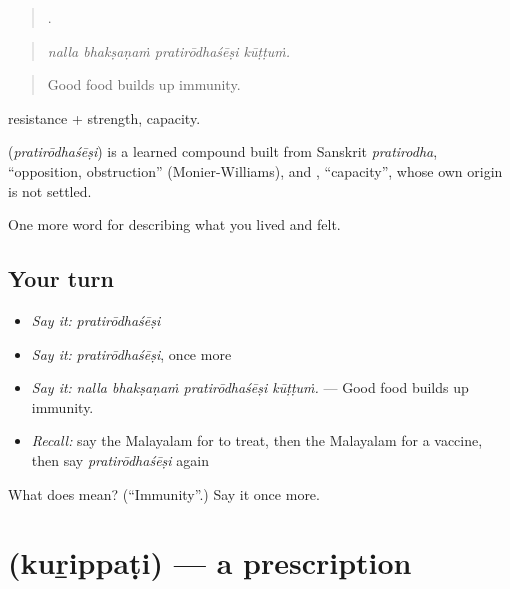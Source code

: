 \begin{quote}
   .
\end{quote}

\begin{quote}
\emph{nalla bhakṣaṇaṁ pratirōdhaśēṣi kūṭṭuṁ.}
\end{quote}

\begin{quote}
Good food builds up immunity.
\end{quote}

 resistance +  strength, capacity.

\begin{cousinweb}
\textbf{} (\emph{pratirōdhaśēṣi}) is a learned compound built from Sanskrit \emph{pratirodha}, \textquotedblleft{}opposition, obstruction\textquotedblright{} (Monier-Williams), and , \textquotedblleft{}capacity\textquotedblright{}, whose own origin is not settled.
\end{cousinweb}

\begin{grammarlens}[title={What you've built}]
One more word for describing what you lived and felt.
\end{grammarlens}

\subsection*{Your turn}
\begin{itemize}
\raggedright
  \item \emph{Say it:} \emph{pratirōdhaśēṣi}
  \item \emph{Say it:} \emph{pratirōdhaśēṣi}, once more
  \item \emph{Say it:} \emph{nalla bhakṣaṇaṁ pratirōdhaśēṣi kūṭṭuṁ.} — Good food builds up immunity.
  \item \emph{Recall:} say the Malayalam for to treat, then the Malayalam for a vaccine, then say \emph{pratirōdhaśēṣi} again
\end{itemize}

\begin{tcolorbox}[breakable,colback=teal!4,colframe=teal!35!black,title={Before you move on}]
What does  mean? (\textquotedblleft{}Immunity\textquotedblright{}.) Say it once more.
\end{tcolorbox}
\section[\texorpdfstring{\ml{കുറിപ്പടി} (kuṟippaṭi)}{കുറിപ്പടി (kuṟippaṭi)}]{ (kuṟippaṭi) — a prescription}

